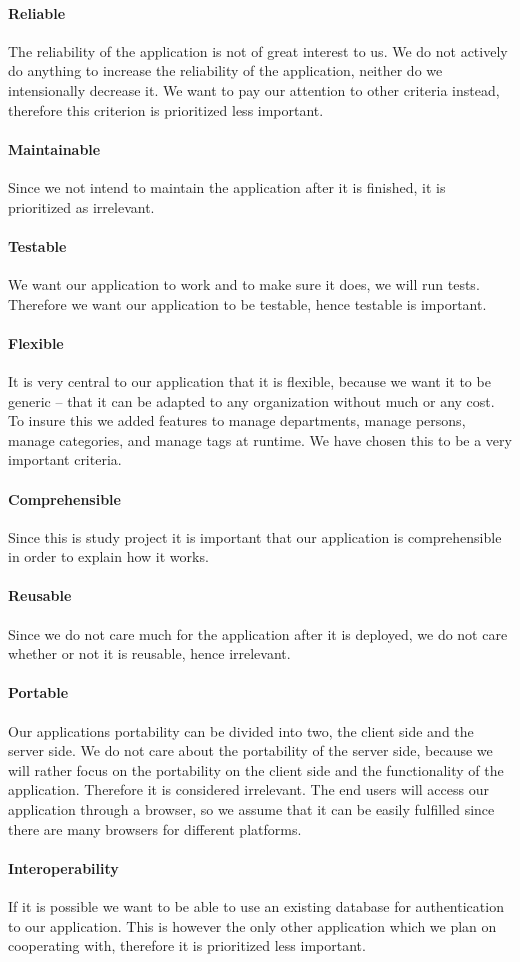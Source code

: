 \paragraph{Reliable}
The reliability of the \hdesk[] application is not of great interest to us.
We do not actively do anything to increase the reliability of the application, neither do we intensionally decrease it.
We want to pay our attention to other criteria instead, therefore this criterion is prioritized less important.
\paragraph{Maintainable}
Since we not intend to maintain the application after it is finished, it is prioritized as irrelevant.
\paragraph{Testable}
We want our application to work and to make sure it does, we will run tests.
Therefore we want our application to be testable, hence testable is important. 
\paragraph{Flexible}
It is very central to our application that it is flexible, because we want it to be generic -- that it can be adapted to any organization without much or any cost. To insure this we added features to manage departments, manage persons, manage categories, and manage tags at runtime. We have chosen this to be a very important criteria.
\paragraph{Comprehensible}
Since this is study project it is important that our application is comprehensible in order to explain how it works. 
\paragraph{Reusable}
Since we do not care much for the application after it is deployed, we do not care whether or not it is reusable, hence irrelevant.
\paragraph{Portable}
Our applications portability can be divided into two, the client side and the server side.
We do not care about the portability of the server side, because we will rather focus on the portability on the client side and the functionality of the application.
Therefore it is considered irrelevant.
The end users will access our application through a browser, so we assume that it can be easily fulfilled since there are many browsers for different platforms. \cite{chrome10}\cite{firefox}
\paragraph{Interoperability}
If it is possible we want to be able to use an existing database for authentication to our application.
This is however the only other application which we plan on cooperating with, therefore it is prioritized less important.